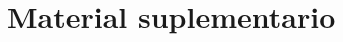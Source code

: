 \clearpage
\section*{Material suplementario}
\setcounter{figure}{0}
\renewcommand{\thefigure}{S\arabic{figure}}
\setcounter{table}{0}
\renewcommand{\thetable}{S\arabic{table}}
